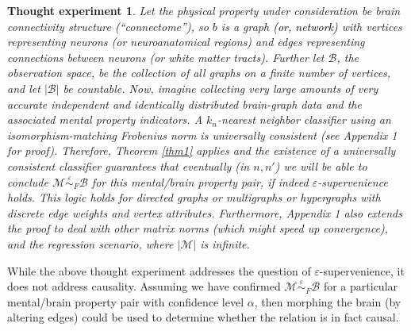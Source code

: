\documentclass{article}
\newcommand{\mB}{\mathcal{B}}
\newcommand{\mM}{\mathcal{M}}
\newcommand{\MeB}{\mM \overset{\varepsilon}{{\sim}}_F \mB}
\providecommand{\tr}[1]{\textcolor{black}{#1}}
\newtheorem{thex}{Thought experiment}
\begin{document}
\begin{thex}
Let the physical property under consideration be brain connectivity structure (``connectome''), so $b$ is a graph \tr{(or, network)} with vertices representing neurons (or neuroanatomical regions) and edges representing connections between neurons (or white matter tracts). Further let $\mB$, the observation space, be the collection of all graphs on a finite number of vertices, and let $|\mB|$ be countable. Now, imagine collecting very large amounts of very accurate independent and identically distributed brain-graph data and the associated mental property indicators. A $k_n$-nearest neighbor classifier using an isomorphism-matching Frobenius norm is universally consistent (see Appendix 1 for proof). Therefore, Theorem \ref{thm1} applies and the existence of a universally consistent classifier guarantees that eventually (in $n,n'$) we will be able to conclude $\MeB$ for this mental/brain property pair, if indeed $\varepsilon$-supervenience holds. This logic holds for directed graphs or multigraphs or hypergraphs with discrete edge weights and vertex attributes. Furthermore, Appendix 1 also extends the proof to deal with other matrix norms (which might speed up convergence), and the regression scenario, where $|\mM|$ is infinite.  
\end{thex}

While the above thought experiment addresses the question of $\varepsilon$-supervenience, it does not address causality. Assuming we have confirmed $\MeB$ for a particular mental/brain property pair with confidence level $\alpha$, then morphing the brain (by altering edges) could be used to determine whether the relation is in fact causal.
\end{document}
